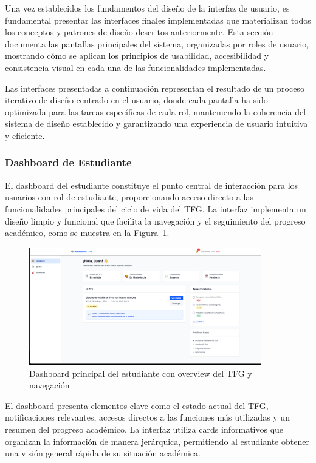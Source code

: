 \documentclass[12pt,a4paper,oneside]{report}
\begin{document}
Una vez establecidos los fundamentos del diseño de la interfaz de usuario, es fundamental presentar las interfaces finales implementadas que materializan todos los conceptos y patrones de diseño descritos anteriormente. Esta sección documenta las pantallas principales del sistema, organizadas por roles de usuario, mostrando cómo se aplican los principios de usabilidad, accesibilidad y consistencia visual en cada una de las funcionalidades implementadas.

Las interfaces presentadas a continuación representan el resultado de un proceso iterativo de diseño centrado en el usuario, donde cada pantalla ha sido optimizada para las tareas específicas de cada rol, manteniendo la coherencia del sistema de diseño establecido y garantizando una experiencia de usuario intuitiva y eficiente.

\subsubsection{Dashboard de Estudiante}\label{dashboard-de-estudiante}

El dashboard del estudiante constituye el punto central de interacción para los usuarios con rol de estudiante, proporcionando acceso directo a las funcionalidades principales del ciclo de vida del TFG. La interfaz implementa un diseño limpio y funcional que facilita la navegación y el seguimiento del progreso académico, como se muestra en la Figura~\ref{fig:dashboard-estudiante}.

\begin{figure}[H]
\centering
\includegraphics[width=0.9\textwidth]{processed/images/dashboard_estudiante.png}
\caption{Dashboard principal del estudiante con overview del TFG y navegación}
\label{fig:dashboard-estudiante}
\end{figure}

El dashboard presenta elementos clave como el estado actual del TFG, notificaciones relevantes, accesos directos a las funciones más utilizadas y un resumen del progreso académico. La interfaz utiliza cards informativos que organizan la información de manera jerárquica, permitiendo al estudiante obtener una visión general rápida de su situación académica.
\end{document}
